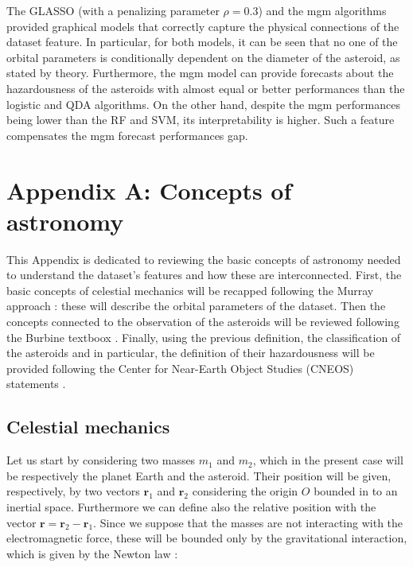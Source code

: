 \documentclass[12pt,%
               a4paper,%
               oneside,openany,%
               titlepage,%
               headinclude,footinclude,%
               BCOR5mm,%
               cleardoublepage=empty,%
               tablecaptionabove,%
               floatperchapter,
               ]{scrreprt}                 %
\begin{document}
The GLASSO (with a penalizing parameter $\rho=0.3$) and the mgm algorithms provided graphical models that correctly capture the physical connections of the dataset feature. In particular, for both models, it can be seen that no one of the orbital parameters is conditionally dependent on the diameter of the asteroid, as stated by theory. Furthermore, the mgm model can provide forecasts about the hazardousness of the asteroids with almost equal or better performances than the logistic and QDA algorithms.  On the other hand, despite the mgm performances being lower than the RF and SVM, its interpretability is higher.  Such a feature compensates the mgm forecast performances gap.

\chapter{Appendix A: Concepts of astronomy}

This Appendix is dedicated to reviewing the basic concepts of astronomy needed to understand the dataset's features and how these are interconnected. First, the basic concepts of celestial mechanics will be recapped following the Murray approach \cite{murray1999solar}: these will describe the orbital parameters of the dataset. Then the concepts connected to the observation of the asteroids will be reviewed following the Burbine textboox \cite{burbine2016asteroids}. Finally, using the previous definition, the classification of the asteroids and in particular, the definition of their hazardousness will be provided following the Center for Near-Earth Object Studies (CNEOS) statements \cite{nasa_classification}. 

\section{Celestial mechanics}

Let us start by considering two masses $m_{1}$ and $m_{2}$, which in the present case will be respectively the planet Earth and the asteroid. Their position will be given, respectively, by two vectors $\textbf{r}_{1}$ and $\textbf{r}_{2}$ considering the origin $O$ bounded in to an inertial space. Furthermore we can define also the relative position with the vector $\textbf{r}=\textbf{r}_{2}-\textbf{r}_{1}$. Since we suppose that the masses are not interacting with the electromagnetic force, these will be bounded only by the gravitational interaction, which is given by the Newton law \cite{murray1999solar}:
\end{document}
